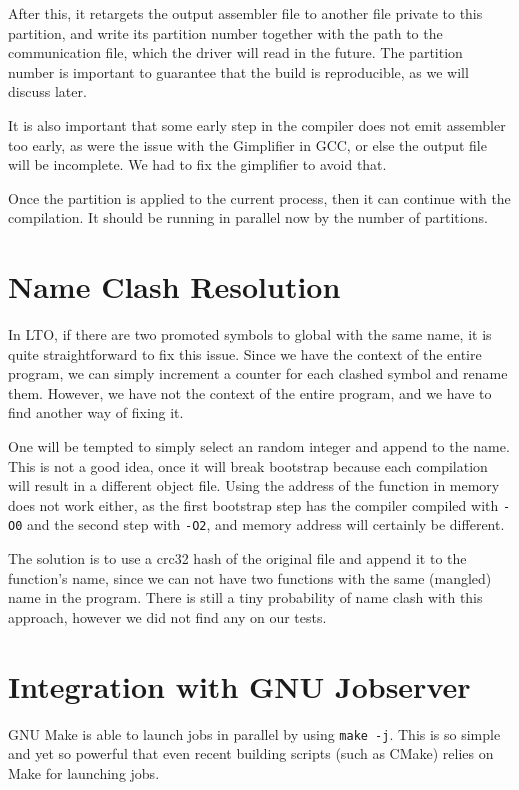 \documentclass[runningheads]{llncs}
\begin{document}
After this, it retargets the output assembler file to another file private
to this partition,
and write its partition number together with the path to the communication
file, which the driver will read in the future. The partition number is
important to guarantee that the build is reproducible, as we will discuss
later.

It is also important that some early step in the compiler does not emit assembler
too early, as were the issue with the Gimplifier in GCC, or else the output
file will be incomplete. We had to fix the gimplifier to avoid that.

Once the partition is applied to the current process, then it can
continue with the compilation. It should be running in parallel
now by the number of partitions.

\section{Name Clash Resolution}

In LTO, if there are two promoted symbols to global with the same name, it is
quite straightforward to fix this issue. Since we have the context of the
entire program, we can simply increment a counter for each clashed symbol and
rename them. However, we have not the context of the entire program, and we
have to find another way of fixing it.

One will be tempted to simply select an random integer and append to the name.
This is not a good idea, once it will break bootstrap because each
compilation will result in a different object file. Using the address of the
function in memory does not work either, as the first bootstrap step has the
compiler compiled with \texttt{-O0} and the second step with \texttt{-O2}, and
memory address will certainly be different.

The solution is to
use a crc32 hash of the original file and append it to the function's name,
since we can not have two functions with the same (mangled) name in the program.
There is still a tiny probability of name clash with this approach, however we did
not find any on our tests.

\section{Integration with GNU Jobserver}

GNU Make is able to launch jobs in parallel by using \texttt{make -j}. This
is so simple and yet so powerful that even recent building scripts (such as CMake)
relies on Make for launching jobs.
\end{document}
